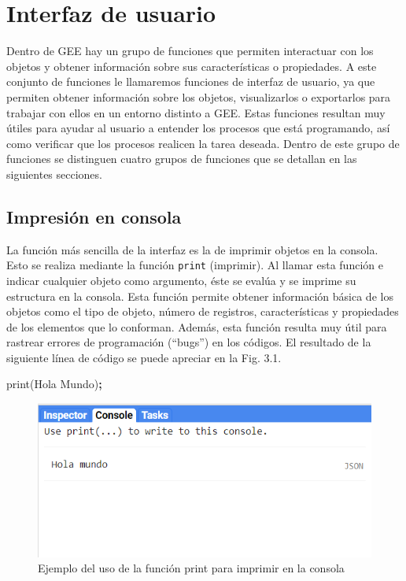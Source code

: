 \documentclass[
  12pt,
  letterpaper,
  twoside]{book}
\newenvironment{Shaded}{\begin{snugshade}}{\end{snugshade}}
\newcommand{\FunctionTok}[1]{\textcolor[rgb]{0.00,0.00,0.00}{#1}}
\newcommand{\NormalTok}[1]{#1}
\newcommand{\OperatorTok}[1]{\textcolor[rgb]{0.81,0.36,0.00}{\textbf{#1}}}
\newcommand{\StringTok}[1]{\textcolor[rgb]{0.31,0.60,0.02}{#1}}
\begin{document}
\newpage

\hypertarget{interfaz-de-usuario}{%
\chapter{Interfaz de usuario}\label{interfaz-de-usuario}}

Dentro de GEE hay un grupo de funciones que permiten interactuar con los objetos y obtener información sobre sus características o propiedades. A este conjunto de funciones le llamaremos funciones de interfaz de usuario, ya que permiten obtener información sobre los objetos, visualizarlos o exportarlos para trabajar con ellos en un entorno distinto a GEE. Estas funciones resultan muy útiles para ayudar al usuario a entender los procesos que está programando, así como verificar que los procesos realicen la tarea deseada. Dentro de este grupo de funciones se distinguen cuatro grupos de funciones que se detallan en las siguientes secciones.

\hypertarget{impresiuxf3n-en-consola}{%
\section{Impresión en consola}\label{impresiuxf3n-en-consola}}

La función más sencilla de la interfaz es la de imprimir objetos en la consola. Esto se realiza mediante la función \texttt{print} (imprimir). Al llamar esta función e indicar cualquier objeto como argumento, éste se evalúa y se imprime su estructura en la consola. Esta función permite obtener información básica de los objetos como el tipo de objeto, número de registros, características y propiedades de los elementos que lo conforman. Además, esta función resulta muy útil para rastrear errores de programación (``bugs'') en los códigos. El resultado de la siguiente línea de código se puede apreciar en la Fig. 3.1.

\begin{Shaded}
\begin{Highlighting}[]
\FunctionTok{print}\NormalTok{(}\StringTok{\textquotesingle{}Hola Mundo\textquotesingle{}}\NormalTok{)}\OperatorTok{;}
\end{Highlighting}
\end{Shaded}

\begin{figure}[btp]

{\centering \includegraphics[width=0.3\linewidth]{Img/holaMundo} 

}

\caption{Ejemplo del uso de la función print para imprimir en la consola}\label{fig:unnamed-chunk-25}
\end{figure}
\end{document}
